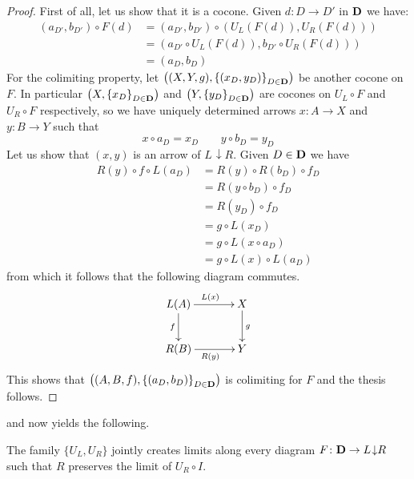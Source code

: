 \documentclass[runningheads,envcountsect]{llncs}
\def\D{\textbf {\textup{D}}}
\newcommand{\comma}[2]{#1\hspace{1pt} {\downarrow}#2}
\begin{document}
\begin{proof}
	First of all, let us show that it is a cocone. Given $d\colon D\to D'$ in $\D$ we have:
	\begin{align*}
		\left(a_{D'}, b_{D'}\right)\circ F(d)&=	\left(a_{D'}, b_{D'}\right)\circ \left(U_L(F(d)), U_R(F(d))\right)\\&=\left( a_{D'}\circ U_L(F(d)),  b_{D'}\circ U_R(F(d)) \right)\\&=\left(a_D, b_D\right)
	\end{align*}
	For the colimiting property, let $\left((X, Y, g), \left\{\left(x_D, y_D\right)\right\}_{D\in \D}\right)$ be another cocone on $F$. In particular $\left(X, \left\{x_D\right\}_{D\in \D}\right)$ and $\left(Y, \left\{y_D\right\}_{D\in \D}\right)$ are cocones on $U_L\circ F$ and $U_R\circ F$ respectively, so we have uniquely determined arrows $x\colon A\rightarrow X$ and $y\colon B\rightarrow Y$ such that 
	\[x\circ a_D= x_D \qquad y\circ b_D= y_D\]
	Let us show that $(x,y)$ is an arrow of $\comma{L}{R}$. Given $D\in \D$ we have
	\begin{align*}
		R(y)\circ f\circ L(a_D)&=R(y)\circ R\left(b_D\right)\circ f_D\\&=R\left(y\circ b_D\right)\circ f_D\\&=R\left(y_D\right)\circ f_D\\&= g\circ L\left(x_D\right)\\&=g\circ L\left(x\circ a_D\right)\\&=g\circ L(x)\circ L\left(a_D\right)
	\end{align*}
	from which it follows  that the following diagram commutes.
	\[\xymatrix@C=35pt{L(A)\ar[d]_{f} \ar[r]^{L(x)} & X \ar[d]^{g}\\ R(B) \ar[r]_{R(y)}& Y}\]
	This shows that $\left((A, B, f), \left\{(a_D, b_D)\right\}_{D\in \D}\right)$ is colimiting for $F$ and the thesis follows.
\end{proof} 


 and  now yields the following.
\begin{corollary}\label{lim} The family $\{U_L, U_R\}$ jointly creates limits along every diagram $F\colon \D\to \comma{L}{R}$ such that $R$ preserves the limit of $U_R\circ I$.
\end{corollary}
\end{document}
